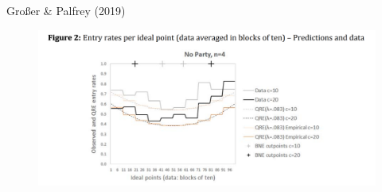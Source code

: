\documentclass[11pt,aspectratio=169]{beamer}
\begin{document}
\begin{frame}{Gro{\ss}er \& Palfrey (2019)}

\begin{figure}
\centering
\includegraphics[width=\textwidth]{palfrey.png}
\end{figure}

\end{frame}
\end{document}
